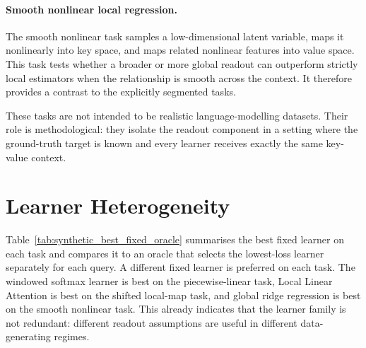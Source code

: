 \paragraph{Smooth nonlinear local regression.}
The smooth nonlinear task samples a low-dimensional latent variable, maps it nonlinearly into key space, and maps related nonlinear features into value space. This task tests whether a broader or more global readout can outperform strictly local estimators when the relationship is smooth across the context. It therefore provides a contrast to the explicitly segmented tasks.

These tasks are not intended to be realistic language-modelling datasets. Their role is methodological: they isolate the readout component in a setting where the ground-truth target is known and every learner receives exactly the same key-value context.

\section{Learner Heterogeneity}\label{sec:learner_heterogeneity}

Table~\ref{tab:synthetic_best_fixed_oracle} summarises the best fixed learner on each task and compares it to an oracle that selects the lowest-loss learner separately for each query. A different fixed learner is preferred on each task. The windowed softmax learner is best on the piecewise-linear task, Local Linear Attention is best on the shifted local-map task, and global ridge regression is best on the smooth nonlinear task. This already indicates that the learner family is not redundant: different readout assumptions are useful in different data-generating regimes.

\begin{table}[t]
\centering
\small
{}
\caption{Best fixed learner and query-wise oracle performance on synthetic TTR readout tasks. Values report mean \(\pm\) standard deviation over five random seeds. Oracle gain is measured relative to the best fixed learner for each task.}\label{tab:synthetic_best_fixed_oracle}
\end{table}

